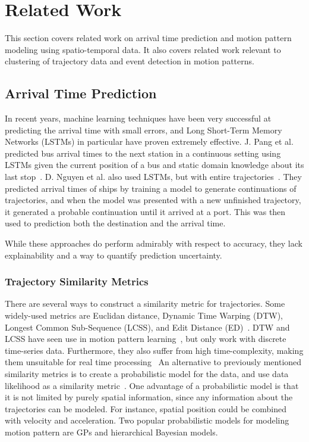 \chapter{Related Work}
\label{cha:theory}

This section covers related work on arrival time prediction 
and motion pattern modeling using spatio-temporal data. It
also covers related work relevant to clustering of trajectory data
and event detection in motion patterns.

\section{Arrival Time Prediction}
In recent years, machine learning techniques have been very successful
at predicting the arrival time with small errors, and Long Short-Term 
Memory Networks (LSTMs) in particular have proven
extremely effective. J. Pang et al. predicted bus arrival times to the next station in a
continuous setting using LSTMs given the current position of a bus and static domain knowledge
about its last stop~\cite{pang2018learning}.
D. Nguyen et al. also used LSTMs, but with entire
trajectories~\cite{Nguyen2018Jun}. They predicted arrival times of
ships by training a model to generate continuations of trajectories, and  
when the model was presented with a new unfinished trajectory, it generated a
probable continuation until it arrived at a port. This was then used to
prediction both the destination and the arrival time.

While these approaches do perform admirably with respect to accuracy, 
they lack explainability and a way to quantify prediction uncertainty.

\subsection{Trajectory Similarity Metrics}\label{sec:traj-sim-metrics}
There are several ways to construct a similarity metric for
trajectories. Some widely-used metrics are Euclidan distance,
Dynamic Time Warping (DTW), Longest Common Sub-Sequence (LCSS), and Edit
Distance (ED)~\cite{Wang2013Jan}. DTW and LCSS have seen use in
motion pattern learning~\cite{Tang2018Aug, Vlachos2002Feb}, but only
work with discrete time-series data. Furthermore, they also suffer
from high time-complexity, making them unsuitable for real time processing~\cite{Zhang2006Aug}
An alternative to previously mentioned similarity metrics is to create
a probabilistic model for the data, and use data
likelihood as a similarity metric~\cite{Kim2011Nov, Tran2014Jun, Tiger2015Jul}.
One advantage of a probabilistic model is that it is not limited by
purely spatial information, since any information about the trajectories can
be modeled. For instance, spatial position could be combined
with velocity and acceleration. 
Two popular probabilistic models for modeling motion pattern are
GPs and hierarchical Bayesian models.

